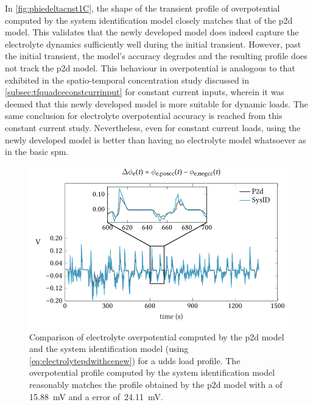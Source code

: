 In \cref{fig:phiedeltacnst1C},   the  shape   of   the   transient  profile   of
overpotential  computed  by  the  system identification  model  closely  matches
that  of the  \gls{p2d} model.  This validates  that the  newly developed  model
does  indeed  capture the  electrolyte  dynamics  sufficiently well  during  the
initial transient.  However, past  the initial  transient, the  model's accuracy
degrades and  the resulting  profile does  not track  the \gls{p2d}  model. This
behaviour in overpotential is analogous to that exhibited in the spatio-temporal
concentration   study   discussed  in \cref{subsec:tfquadceconstcurrinput}   for
constant current inputs,  wherein it was deemed that this  newly developed model
is  more  suitable  for  dynamic  loads. The  same  conclusion  for  electrolyte
overpotential   accuracy  is   reached   from  this   constant  current   study.
Nevertheless, even for  constant current loads, using the  newly developed model
is better than having no electrolyte model whatsoever as in the basic \gls{spm}.


\begin{figure}[!htbp]
    \centering
    \includegraphics{chapters/sys_id/figures/phie_delta_udds.pdf}
    \caption[%
    Electrolyte  overpotential  computed  by the    and  system
    identification models for a  load profile
    ]%
    {%
        Comparison    of    electrolyte    overpotential   computed    by    the
        \gls{p2d}     model    and     the    system     identification    model
        (using \cref{eq:electrolytepdwithcenew}) for a  \gls{udds} load profile.
        The overpotential  profile computed  by the system  identification model
        reasonably matches  the profile obtained  by the \gls{p2d} model  with a
         of \SI{15.88}{\milli\volt} and  a  error of~\SI{24.11}{\milli\volt}.
    }%
    \label{fig:phiedeltacnstudds}
\end{figure}

